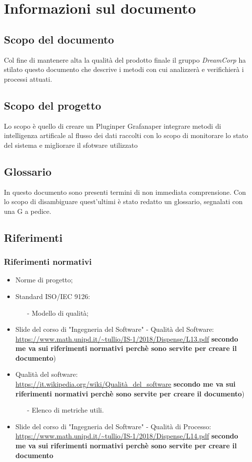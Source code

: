 \section{Informazioni sul documento}
\subsection{Scopo del documento}
 Col fine di mantenere alta la qualità del prodotto finale il gruppo \textit{DreamCorp} ha stilato questo documento che descrive i metodi con cui analizzerà e verifichierà i processi attuati.
 \subsection{Scopo del progetto}
 Lo scopo è quello di creare un Plugin\pedice per Grafana\pedice per integrare metodi di intelligenza artificale al flusso dei dati raccolti con lo scopo di monitorare lo stato del sistema e migliorare il sfotware utilizzato
 \subsection{Glossario}
 In questo documento sono presenti termini di non immediata comprensione. Con lo scopo di disambiguare quest'ultimi è stato redatto un glossario, segnalati con una G a pedice.

 \newpage
 \subsection{Riferimenti}
 \subsubsection{Riferimenti normativi}
 \begin{itemize}
 	\item Norme di progetto;
 	\item Standard ISO/IEC 9126:
 		\begin{itemize}
 			\item[-] Modello di qualità;
 		\end{itemize}
	\item Slide del corso di "Ingegneria del Software" - Qualità del Software: \\
		\url{https://www.math.unipd.it/~tullio/IS-1/2018/Dispense/L13.pdf} \textbf{secondo me va sui riferimenti normativi perchè sono servite per creare il documento})
	\item Qualità del software: \\
		\url{https://it.wikipedia.org/wiki/Qualità_del_software} \textbf{secondo me va sui riferimenti normativi perchè sono servite per creare il documento})
		\begin{itemize}
			\item[-] Elenco di metriche utili.
		\end{itemize} 
	\item  Slide del corso di "Ingegneria del Software" - Qualità di Processo: \\
		\url {https://www.math.unipd.it/~tullio/IS-1/2018/Dispense/L14.pdf}  \textbf{secondo me va sui riferimenti normativi perchè sono servite per creare il documento}
 \end{itemize}
